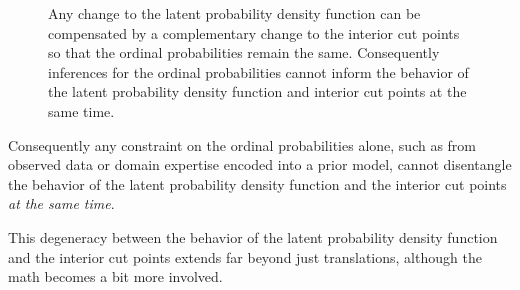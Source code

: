 \documentclass[
  letterpaper,
  DIV=11,
  numbers=noendperiod]{scrartcl}
\begin{document}
\begin{figure}


\caption{\label{fig-trans-degen}Any change to the latent probability
density function can be compensated by a complementary change to the
interior cut points so that the ordinal probabilities remain the same.
Consequently inferences for the ordinal probabilities cannot inform the
behavior of the latent probability density function and interior cut
points at the same time.}

\end{figure}%

Consequently any constraint on the ordinal probabilities alone, such as
from observed data or domain expertise encoded into a prior model,
cannot disentangle the behavior of the latent probability density
function and the interior cut points \emph{at the same time}.

This degeneracy between the behavior of the latent probability density
function and the interior cut points extends far beyond just
translations, although the math becomes a bit more involved.
\end{document}
